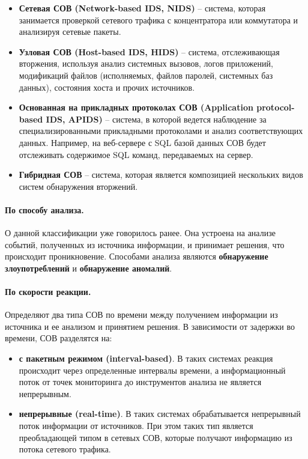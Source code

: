 \begin{itemize}
	\item \textbf{Сетевая СОВ (Network-based IDS, NIDS)} -- система, 
	которая занимается проверкой сетевого трафика с концентратора или коммутатора и анализируя сетевые пакеты.
	\item \textbf{Узловая СОВ (Host-based IDS, HIDS)} -- система, 
	отслеживающая вторжения, используя анализ системных вызовов, логов приложений, модификаций файлов 
	(исполняемых, файлов паролей, системных баз данных), состояния хоста и прочих источников. 
	\item \textbf{Основанная на прикладных протоколах СОВ (Application protocol-based IDS, APIDS)} -- система, 
	в которой ведется наблюдение за специализированными прикладными протоколами и анализ соответствующих 
	данных. Например, на веб-сервере с SQL базой данных СОВ будет отслеживать содержимое SQL команд, 
	передаваемых на сервер.
	\item \textbf{Гибридная СОВ} -- система, которая является композицией нескольких видов 
	систем обнаружения вторжений.
\end{itemize}

\paragraph*{По способу анализа.}

О данной классификации уже говорилось ранее. Она устроена на анализе событий, полученных из источника 
информации, и принимает решения, что происходит проникновение. Способами анализа являются 
\textbf{обнаружение злоупотреблений} и \textbf{обнаружение аномалий}.

\paragraph*{По скорости реакции.}

Определяют два типа СОВ по времени между получением информации из источника и ее анализом и принятием решения.
В зависимости от задержки во времени, СОВ разделятся на:
\begin{itemize}
	\item \textbf{с пакетным режимом (interval-based)}. В таких системах реакция происходит 
	через определенные интервалы времени, а информационный поток от точек мониторинга до инструментов анализа
	не является непрерывным.
	\item \textbf{непрерывные (real-time)}. В таких системах обрабатывается непрерывный поток информации 
	от источников. При этом таких тип является преобладающей типом в сетевых СОВ, которые получают 
	информацию из потока сетевого трафика.
\end{itemize}


